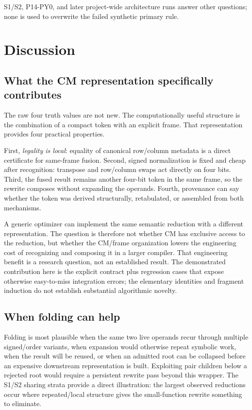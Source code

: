 \documentclass[10pt]{article}
\theoremstyle{plain}
\theoremstyle{definition}
\theoremstyle{remark}
\begin{document}
S1/S2, P14-PY0, and later project-wide architecture runs answer other questions; none is used to overwrite the failed synthetic primary rule.

\section{Discussion}
\label{sec:discussion}

\subsection{What the CM representation specifically contributes}

The raw four truth values are not new. The computationally useful structure is the combination of a compact token with an explicit frame. That representation provides four practical properties.

First, \emph{legality is local}: equality of canonical row/column metadata is a direct certificate for same-frame fusion. Second, signed normalization is fixed and cheap after recognition: transpose and row/column swaps act directly on four bits. Third, the fused result remains another four-bit token in the same frame, so the rewrite composes without expanding the operands. Fourth, provenance can say whether the token was derived structurally, retabulated, or assembled from both mechanisms.

A generic optimizer can implement the same semantic reduction with a different representation. The question is therefore not whether CM has exclusive access to the reduction, but whether the CM/frame organization lowers the engineering cost of recognizing and composing it in a larger compiler. That engineering benefit is a research question, not an established result. The demonstrated contribution here is the explicit contract plus regression cases that expose otherwise easy-to-miss integration errors; the elementary identities and fragment induction do not establish substantial algorithmic novelty.

\subsection{When folding can help}

Folding is most plausible when the same two live operands recur through multiple signed/order variants, when expansion would otherwise repeat symbolic work, when the result will be reused, or when an admitted root can be collapsed before an expensive downstream representation is built. Exploiting pair children below a rejected root would require a persistent rewrite pass beyond this wrapper. The S1/S2 sharing strata provide a direct illustration: the largest observed reductions occur where repeated/local structure gives the small-function rewrite something to eliminate.
\end{document}
